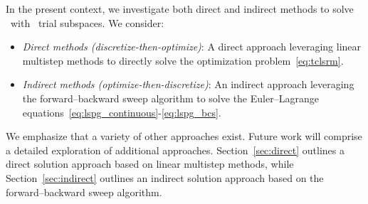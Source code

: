 In the present context, we investigate both direct and indirect methods to solve \methodAcronym\ with \spatialAcronym\ trial
subspaces. We consider: 
\begin{itemize} \item \textit{Direct methods (discretize-then-optimize)}: A direct approach leveraging linear multistep methods to directly solve the optimization problem~\eqref{eq:tclsrm}.
\item \textit{Indirect methods (optimize-then-discretize)}: An indirect approach leveraging the forward--backward sweep algorithm to solve the Euler--Lagrange equations~\eqref{eq:lspg_continuous}-\eqref{eq:lspg_bcs}.

\end{itemize} 
We emphasize that a variety of other approaches exist. Future work will comprise a detailed exploration
of additional approaches.
Section~\ref{sec:direct} outlines a direct solution approach based on linear
multistep methods, while Section~\ref{sec:indirect} outlines an indirect
solution approach based on the forward--backward sweep algorithm. 





